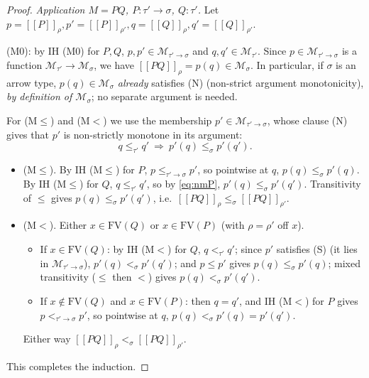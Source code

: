 \documentclass{amsart}
\theoremstyle{definition}
\newcommand{\interp}[1]{[\![#1]\!]}
\newcommand{\FV}{\mathrm{FV}}
\begin{document}
\begin{proof}
\medskip\noindent\emph{Application $M=PQ$, $P:\tau'\to\sigma$, $Q:\tau'$.}
Let $p=\interp{P}_\rho,p'=\interp{P}_{\rho'},q=\interp{Q}_\rho,q'=\interp{Q}_{\rho'}$.

(M0): by IH \textup{(M0)} for $P,Q$, $p,p'\in\mathcal M_{\tau'\to\sigma}$ and
$q,q'\in\mathcal M_{\tau'}$. Since $p\in\mathcal M_{\tau'\to\sigma}$ is a function
$\mathcal M_{\tau'}\to\mathcal M_\sigma$, we have $\interp{PQ}_\rho=p(q)\in\mathcal M_\sigma$.
In particular, if $\sigma$ is an arrow type, $p(q)\in\mathcal M_\sigma$ \emph{already}
satisfies (N) (non-strict argument monotonicity), \emph{by definition of $\mathcal M_\sigma$};
no separate argument is needed.

For (M$\le$) and (M$<$) we use the membership $p'\in\mathcal M_{\tau'\to\sigma}$, whose
clause (N) gives that $p'$ is non-strictly monotone in its argument:
\begin{equation}\label{eq:nmP}
  q\le_{\tau'}q'\ \Longrightarrow\ p'(q)\le_\sigma p'(q').
\end{equation}
\begin{itemize}
\item (M$\le$). By IH \textup{(M$\le$)} for $P$, $p\le_{\tau'\to\sigma}p'$, so pointwise at
  $q$, $p(q)\le_\sigma p'(q)$. By IH \textup{(M$\le$)} for $Q$, $q\le_{\tau'}q'$, so by
  \eqref{eq:nmP}, $p'(q)\le_\sigma p'(q')$. Transitivity of $\le$ gives
  $p(q)\le_\sigma p'(q')$, i.e.\ $\interp{PQ}_\rho\le_\sigma\interp{PQ}_{\rho'}$.
\item (M$<$). Either $x\in\FV(Q)$ or $x\in\FV(P)$ (with $\rho=\rho'$ off $x$).
  \begin{itemize}
  \item If $x\in\FV(Q)$: by IH \textup{(M$<$)} for $Q$, $q<_{\tau'}q'$; since $p'$ satisfies
    (S) (it lies in $\mathcal M_{\tau'\to\sigma}$), $p'(q)<_\sigma p'(q')$; and $p\le p'$
    gives $p(q)\le_\sigma p'(q)$; mixed transitivity ($\le$ then $<$) gives
    $p(q)<_\sigma p'(q')$.
  \item If $x\notin\FV(Q)$ and $x\in\FV(P)$: then $q=q'$, and IH \textup{(M$<$)} for $P$
    gives $p<_{\tau'\to\sigma}p'$, so pointwise at $q$, $p(q)<_\sigma p'(q)=p'(q')$.
  \end{itemize}
  Either way $\interp{PQ}_\rho<_\sigma\interp{PQ}_{\rho'}$.
\end{itemize}
This completes the induction.
\end{proof}
\end{document}
